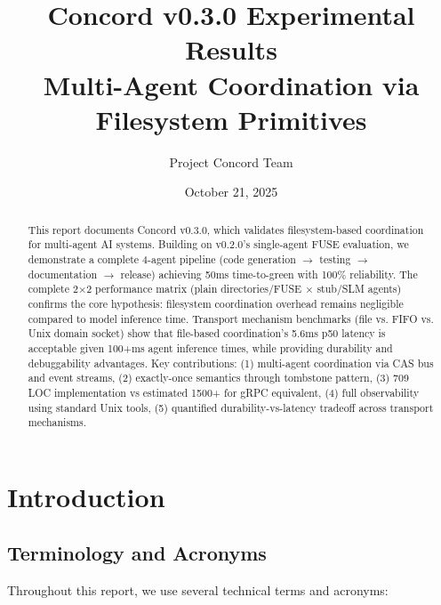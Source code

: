 \documentclass[11pt]{article}
\title{\textbf{Concord v0.3.0 Experimental Results}\\
\large Multi-Agent Coordination via Filesystem Primitives}
\author{Project Concord Team}
\date{October 21, 2025}
\begin{document}
\maketitle

\begin{abstract}
This report documents Concord v0.3.0, which validates filesystem-based coordination for multi-agent AI systems. Building on v0.2.0's single-agent FUSE evaluation, we demonstrate a complete 4-agent pipeline (code generation $\rightarrow$ testing $\rightarrow$ documentation $\rightarrow$ release) achieving 50ms time-to-green with 100\% reliability. The complete 2×2 performance matrix (plain directories/FUSE × stub/SLM agents) confirms the core hypothesis: filesystem coordination overhead remains negligible compared to model inference time. Transport mechanism benchmarks (file vs. FIFO vs. Unix domain socket) show that file-based coordination's 5.6ms p50 latency is acceptable given 100+ms agent inference times, while providing durability and debuggability advantages. Key contributions: (1) multi-agent coordination via CAS bus and event streams, (2) exactly-once semantics through tombstone pattern, (3) 709 LOC implementation vs estimated 1500+ for gRPC equivalent, (4) full observability using standard Unix tools, (5) quantified durability-vs-latency tradeoff across transport mechanisms.
\end{abstract}

\tableofcontents
\newpage

\section{Introduction}

\subsection{Terminology and Acronyms}

Throughout this report, we use several technical terms and acronyms:
\end{document}
